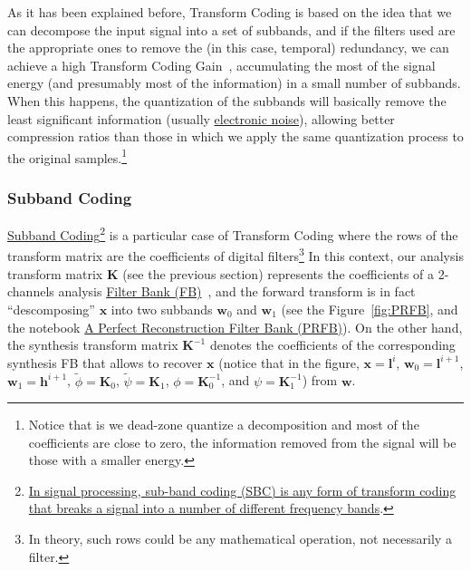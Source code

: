 As it has been explained before, Transform Coding is based on the idea
that we can decompose the input signal into a set of subbands, and if
the filters used are the appropriate ones to remove the (in this case,
temporal) redundancy, we can achieve a high Transform Coding
Gain~\cite{sayood2017introduction}, accumulating the most of the
signal energy (and presumably most of the information) in a small
number of subbands. When this happens, the quantization of the
subbands will basically remove the least significant information
(usually
\href{https://en.wikipedia.org/wiki/Noise_(electronics)}{electronic
  noise}), allowing better compression ratios than those in which we
apply the same quantization process to the original
samples.\footnote{Notice that is we dead-zone quantize a decomposition
  and most of the coefficients are close to zero, the information
  removed from the signal will be those with a smaller energy.}


\subsubsection{Subband Coding}


\href{https://en.wikipedia.org/wiki/Sub-band_coding}{Subband
  Coding}\footnote{\href{https://en.wikipedia.org/wiki/Sub-band_coding}{In
    signal processing, sub-band coding (SBC) is any form of transform
    coding that breaks a signal into a number of different frequency
    bands}.} is a particular case of Transform Coding where the rows
of the transform matrix are the coefficients of digital filters\footnote{In
  theory, such rows could be any mathematical operation, not
  necessarily a filter.} In this context, our analysis transform
matrix ${\mathbf K}$ (see the previous section) represents the coefficients of
a 2-channels analysis
\href{https://en.wikipedia.org/wiki/Filter_bank}{Filter Bank
  (FB)}~\cite{vetterli1995wavelets}, and the forward transform is in
fact ``descomposing'' ${\mathbf x}$ into two subbands ${\mathbf w}_0$
and ${\mathbf w}_1$ (see the Figure~\ref{fig:PRFB}, and the notebook
\href{https://github.com/Tecnologias-multimedia/Tecnologias-multimedia.github.io/blob/master/contents/transform_coding/PRFB.ipynb}{A
  Perfect Reconstruction Filter Bank (PRFB)}). On the other hand, the
synthesis transform matrix ${\mathbf K}^{-1}$ denotes the coefficients of the
corresponding synthesis FB that allows to recover ${\mathbf x}$
(notice that in the figure, ${\mathbf x}={\mathbf l}^i$,
${\mathbf w}_0={\mathbf l}^{i+1}$, ${\mathbf w}_1={\mathbf h}^{i+1}$,
$\tilde\phi={\mathbf K}_0$, $\tilde\psi={\mathbf K}_1$,
$\phi={\mathbf K}^{-1}_0$, and $\psi={\mathbf K}^{-1}_1$) from ${\mathbf w}$.

